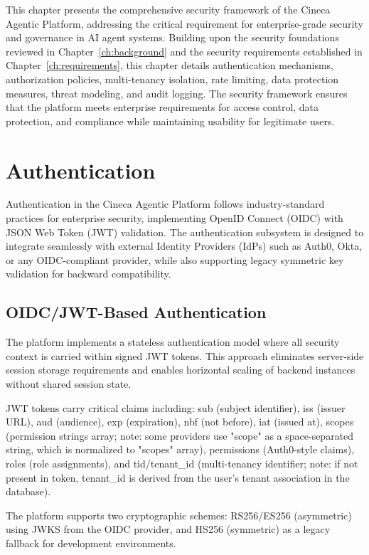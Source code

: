 \documentclass[a4paper,twoside]{sapthesis}
\begin{document}
This chapter presents the comprehensive security framework of the Cineca Agentic Platform, addressing the critical requirement for enterprise-grade security and governance in AI agent systems. Building upon the security foundations reviewed in Chapter~\ref{ch:background} and the security requirements established in Chapter~\ref{ch:requirements}, this chapter details authentication mechanisms, authorization policies, multi-tenancy isolation, rate limiting, data protection measures, threat modeling, and audit logging. The security framework ensures that the platform meets enterprise requirements for access control, data protection, and compliance while maintaining usability for legitimate users.

\section{Authentication}
\label{sec:authentication}

Authentication in the Cineca Agentic Platform follows industry-standard practices for enterprise security, implementing OpenID Connect (OIDC) with JSON Web Token (JWT) validation. The authentication subsystem is designed to integrate seamlessly with external Identity Providers (IdPs) such as Auth0, Okta, or any OIDC-compliant provider, while also supporting legacy symmetric key validation for backward compatibility.

\subsection{OIDC/JWT-Based Authentication}
\label{subsec:oidc-jwt}

The platform implements a stateless authentication model where all security context is carried within signed JWT tokens. This approach eliminates server-side session storage requirements and enables horizontal scaling of backend instances without shared session state.

JWT tokens carry critical claims including: sub (subject identifier), iss (issuer URL), aud (audience), exp (expiration), nbf (not before), iat (issued at), scopes (permission strings array; note: some providers use "scope" as a space-separated string, which is normalized to "scopes" array), permissions (Auth0-style claims), roles (role assignments), and tid/tenant\_id (multi-tenancy identifier; note: if not present in token, tenant\_id is derived from the user's tenant association in the database).

The platform supports two cryptographic schemes: RS256/ES256 (asymmetric) using JWKS from the OIDC provider, and HS256 (symmetric) as a legacy fallback for development environments.
\end{document}
